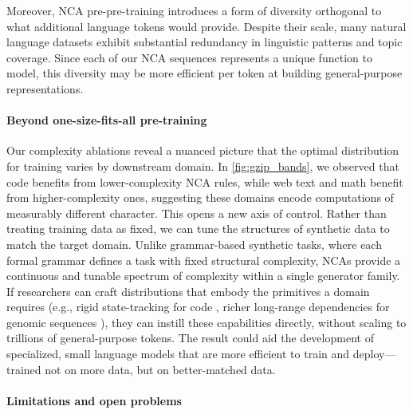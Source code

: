 \documentclass{article}
\theoremstyle{plain}
\theoremstyle{definition}
\theoremstyle{remark}
\begin{document}
Moreover, NCA pre-pre-training introduces a form of diversity orthogonal to what additional language tokens would provide. Despite their scale, many natural language datasets exhibit substantial redundancy \citep{abbas2023semdedupdataefficientlearningwebscale} in linguistic patterns and topic coverage. Since each of our NCA sequences represents a unique function to model, this diversity may be more efficient per token at building general-purpose representations.


\paragraph{Beyond one-size-fits-all pre-training}

Our complexity ablations reveal a nuanced picture that the optimal distribution for training varies by downstream domain. In \cref{fig:gzip_bands}, we observed that code benefits from lower-complexity NCA rules, while web text and math benefit from higher-complexity ones, suggesting these domains encode computations of measurably different character. This opens a new axis of control. Rather than treating training data as fixed, we can tune the structures of synthetic data to match the target domain. Unlike grammar-based synthetic tasks, where each formal grammar defines a task with fixed structural complexity, NCAs provide a continuous and tunable spectrum of complexity within a single generator family. If researchers can craft distributions that embody the primitives a domain requires (e.g., rigid state-tracking for code \citep{li2025codeiocondensingreasoningpatterns}, richer long-range dependencies for genomic sequences \citep{wu2025generatorlongcontextgenerativegenomic}), they can instill these capabilities directly, without scaling to trillions of general-purpose tokens.
The result could aid the development of specialized, small language models \citep{belcak2025smalllanguagemodelsfuture} that are more efficient to train and deploy---trained not on more data, but on better-matched data.
\paragraph{Limitations and open problems}
\label{subsec:limits_scaling_nca}
\end{document}
